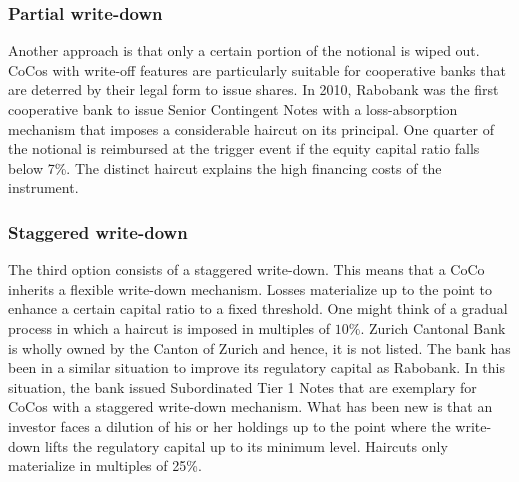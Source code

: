 \subsubsection*{Partial write-down}
Another approach is that only a certain portion of the notional is wiped out. CoCos with write-off features are particularly suitable for cooperative banks that are deterred by their legal form to issue shares. \citep{de2014handbook} In 2010, Rabobank was the first cooperative bank to issue Senior Contingent Notes with a loss-absorption mechanism that imposes a considerable haircut on its principal. One quarter of the notional is reimbursed at the trigger event if the equity capital ratio falls below 7\%. The distinct haircut explains the high financing costs of the instrument. 
\citep{rabobank2010}

\subsubsection*{Staggered write-down}
The third option consists of a staggered write-down. This means that a CoCo inherits a flexible write-down mechanism. Losses materialize up to the point to enhance a certain capital ratio to a fixed threshold. One might think of a gradual process in which a haircut is imposed in multiples of $10\%$. \citep{de2014handbook} Zurich Cantonal Bank is wholly owned by the Canton of Zurich and hence, it is not listed. The bank has been in a similar situation to improve its regulatory capital as Rabobank. In this situation, the bank issued Subordinated Tier 1 Notes that are exemplary for CoCos with a staggered write-down mechanism. What has been new is that an investor faces a dilution of his or her holdings up to the point where the write-down lifts the regulatory capital up to its minimum level. Haircuts only materialize in multiples of 25\%. \citep{zkv2013}



